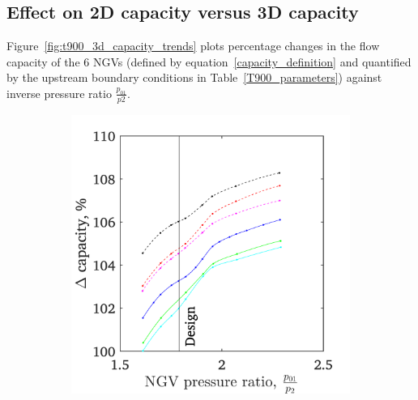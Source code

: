 \documentclass[a4paper, 11pt, oneside]{report}
\begin{document}
\subsection{Effect on 2D capacity versus 3D capacity}

Figure~\ref{fig:t900_3d_capacity_trends} plots percentage changes in the flow capacity of the 6 NGVs (defined by equation~\ref{capacity_definition} and quantified by the upstream boundary conditions in Table~\ref{T900_parameters}) against inverse pressure ratio $\frac{p_{01}}{p2}$.

\begin{figure}[H]
	\centering
	\begin{subfigure}{.45\textwidth}
		\centering
		\includegraphics[width=\linewidth]{figs/t900_3d_capacity_trends.png}
	\end{subfigure}
	\begin{subfigure}{.1125\textwidth}
		\centering

\end{subfigure}
\end{figure}
\end{document}
